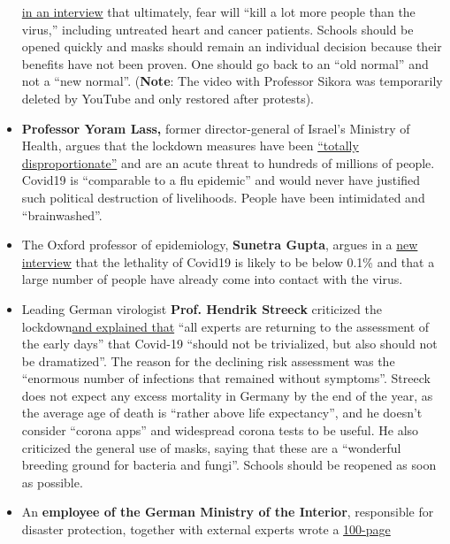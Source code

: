 \begin{itemize}
  \href{https://www.youtube.com/watch?v=uk2YZfnsOPg}{in an interview}
  that ultimately, fear will ``kill a lot more people than the virus,''
  including untreated heart and cancer patients. Schools should be
  opened quickly and masks should remain an individual decision because
  their benefits have not been proven. One should go back to an ``old
  normal'' and not a ``new normal''. (\textbf{Note}: The video with
  Professor Sikora was temporarily deleted by YouTube and only restored
  after protests). 
\item
  \textbf{Professor Yoram Lass,} former director-general of Israel's
  Ministry of Health, argues that the lockdown measures have been
  \href{https://www.spiked-online.com/2020/05/22/nothing-can-justify-this-destruction-of-peoples-lives/}{``totally
  disproportionate''} and are an acute threat to hundreds of millions of
  people. Covid19 is ``comparable to a flu epidemic'' and would never
  have justified such political destruction of livelihoods. People have
  been intimidated and ``brainwashed''.
\item
  The Oxford professor of epidemiology, \textbf{Sunetra Gupta}, argues
  in a
  \href{https://unherd.com/2020/05/oxford-doubles-down-sunetra-gupta-interview/}{new
  interview} that the lethality of Covid19 is likely to be below 0.1\%
  and that a large number of people have already come into contact with
  the virus.
\item
  Leading German virologist \textbf{Prof. Hendrik Streeck} criticized
  the
  lockdown\href{https://www.welt.de/wissenschaft/article209299157/Corona-Krise-Virologe-Streeck-kritisiert-deutschen-Lockdown.html}{and
  explained that} ``all experts are returning to the assessment of the
  early days'' that Covid-19 ``should not be trivialized, but also
  should not be dramatized''. The reason for the declining risk
  assessment was the ``enormous number of infections that remained
  without symptoms''. Streeck does not expect any excess mortality in
  Germany by the end of the year, as the average age of death is
  ``rather above life expectancy'', and he doesn't consider ``corona
  apps'' and widespread corona tests to be useful. He also criticized
  the general use of masks, saying that these are a ``wonderful breeding
  ground for bacteria and fungi''. Schools should be reopened as soon as
  possible.
\item
  An \textbf{employee of the German Ministry of the Interior},
  responsible for disaster protection, together with external experts
  wrote a
  \href{https://www.ichbinanderermeinung.de/Dokument93.pdf}{100-page
}
\end{itemize}
